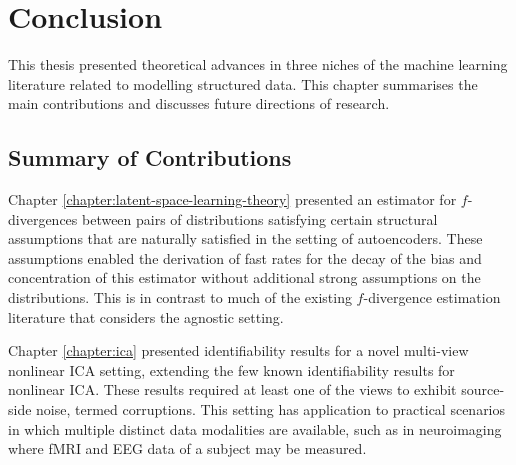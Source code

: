 \chapter{Conclusion}\label{chapter:conclusion}

\ifpdf
    \graphicspath{{Chapter7/Figs/Raster/}{Chapter7/Figs/PDF/}{Chapter7/Figs/}}
\else
    \graphicspath{{Chapter7/Figs/Vector/}{Chapter7/Figs/}}
\fi

This thesis presented theoretical advances in three niches of the machine learning literature related to modelling structured data.
This chapter summarises the main contributions and discusses future directions of research.

\section{Summary of Contributions}

Chapter \ref{chapter:latent-space-learning-theory} presented an estimator for $f$-divergences between pairs of distributions satisfying certain structural assumptions that are naturally satisfied in the setting of autoencoders. 
These assumptions enabled the derivation of fast rates for the decay of the bias and concentration of this estimator without additional strong assumptions on the distributions.
This is in contrast to much of the existing $f$-divergence estimation literature that considers the agnostic setting.


Chapter \ref{chapter:ica} presented identifiability results for a novel multi-view nonlinear ICA setting, extending the few known identifiability results for nonlinear ICA.
These results required at least one of the views to exhibit source-side noise, termed corruptions.
This setting has application to practical scenarios in which multiple distinct data modalities are available, such as in neuroimaging where fMRI and EEG data of a subject may be measured.


